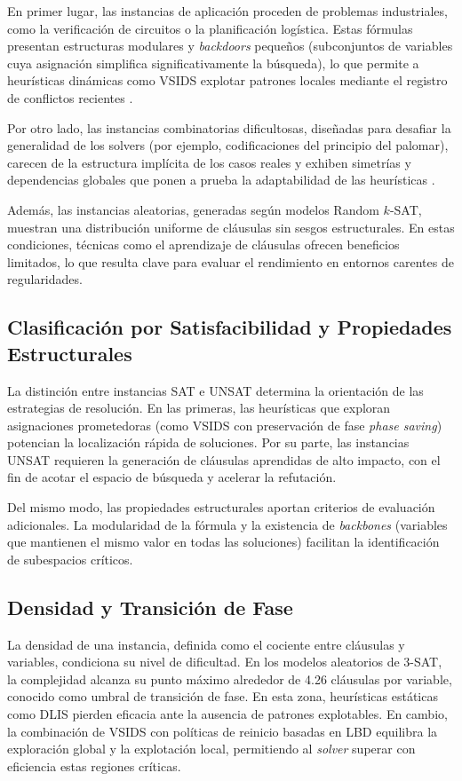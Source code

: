 En primer lugar, las instancias de aplicaci\'on proceden de problemas industriales, como la verificación de circuitos o la planificación logística. Estas fórmulas presentan estructuras modulares y \textit{backdoors} pequeños (subconjuntos de variables cuya asignación simplifica significativamente la búsqueda), lo que permite a heurísticas dinámicas como VSIDS explotar patrones locales mediante el registro de conflictos recientes \cite{zulkoski2018understanding}.

Por otro lado, las instancias combinatorias dificultosas, diseñadas para desafiar la generalidad de los solvers (por ejemplo, codificaciones del principio del palomar), carecen de la estructura implícita de los casos reales y exhiben simetrías y dependencias globales que ponen a prueba la adaptabilidad de las heurísticas \cite{zulkoski2018understanding}.

Además, las instancias aleatorias, generadas según modelos Random $k$-SAT, muestran una distribución uniforme de cláusulas sin sesgos estructurales. En estas condiciones, técnicas como el aprendizaje de cláusulas ofrecen beneficios limitados, lo que resulta clave para evaluar el rendimiento en entornos carentes de regularidades.

\subsection{Clasificación por Satisfacibilidad y Propiedades Estructurales}
La distinción entre instancias SAT e UNSAT determina la orientación de las estrategias de resolución. En las primeras, las heurísticas que exploran asignaciones prometedoras (como VSIDS con preservación de fase \textit{phase saving}) potencian la localizaci\'on r\'apida de soluciones. Por su parte, las instancias UNSAT requieren la generación de cláusulas aprendidas de alto impacto, con el fin de acotar el espacio de b\'usqueda y acelerar la refutación.

Del mismo modo, las propiedades estructurales aportan criterios de evaluación adicionales. La modularidad de la fórmula y la existencia de \textit{backbones} (variables que mantienen el mismo valor en todas las soluciones) facilitan la identificación de subespacios críticos.

\subsection{Densidad y Transición de Fase}
La densidad de una instancia, definida como el cociente entre cláusulas y variables, condiciona su nivel de dificultad. En los modelos aleatorios de 3-SAT, la complejidad alcanza su punto máximo alrededor de 4.26 cláusulas por variable, conocido como umbral de transición de fase. En esta zona, heurísticas estáticas como DLIS pierden eficacia ante la ausencia de patrones explotables. En cambio, la combinación de VSIDS con políticas de reinicio basadas en LBD equilibra la exploración global y la explotación local, permitiendo al \textit{solver} superar con eficiencia estas regiones críticas.

